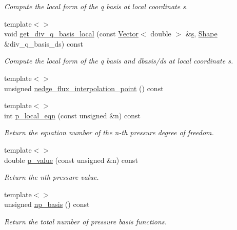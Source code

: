 \begin{DoxyCompactItemize}
\begin{DoxyCompactList}\small\item\em Compute the local form of the q basis at local coordinate s. \end{DoxyCompactList}\item 
{\footnotesize template$<$$>$ }\\void \hyperlink{classoomph_1_1TRaviartThomasDarcyElement_a1fd04fa65b0925c6d23b37c1e04a80cb}{get\+\_\+div\+\_\+q\+\_\+basis\+\_\+local} (const \hyperlink{classoomph_1_1Vector}{Vector}$<$ double $>$ \&\hyperlink{cfortran_8h_ab7123126e4885ef647dd9c6e3807a21c}{s}, \hyperlink{classoomph_1_1Shape}{Shape} \&div\+\_\+q\+\_\+basis\+\_\+ds) const
\begin{DoxyCompactList}\small\item\em Compute the local form of the q basis and dbasis/ds at local coordinate s. \end{DoxyCompactList}\item 
{\footnotesize template$<$$>$ }\\unsigned \hyperlink{classoomph_1_1TRaviartThomasDarcyElement_a7c515fbe4bb25c8c67565fb1584f7f6b}{nedge\+\_\+flux\+\_\+interpolation\+\_\+point} () const
\item 
{\footnotesize template$<$$>$ }\\int \hyperlink{classoomph_1_1TRaviartThomasDarcyElement_af52ce439c8374c3396bb0e7f7a532ca8}{p\+\_\+local\+\_\+eqn} (const unsigned \&n) const
\begin{DoxyCompactList}\small\item\em Return the equation number of the n-\/th pressure degree of freedom. \end{DoxyCompactList}\item 
{\footnotesize template$<$$>$ }\\double \hyperlink{classoomph_1_1TRaviartThomasDarcyElement_aa21b6aad78ec35c661c69fb67700b7e1}{p\+\_\+value} (const unsigned \&n) const
\begin{DoxyCompactList}\small\item\em Return the nth pressure value. \end{DoxyCompactList}\item 
{\footnotesize template$<$$>$ }\\unsigned \hyperlink{classoomph_1_1TRaviartThomasDarcyElement_a89bd2a644fa5e3bd9317c98ae8ab1638}{np\+\_\+basis} () const
\begin{DoxyCompactList}\small\item\em Return the total number of pressure basis functions. \end{DoxyCompactList}\item 

\end{DoxyCompactItemize}
